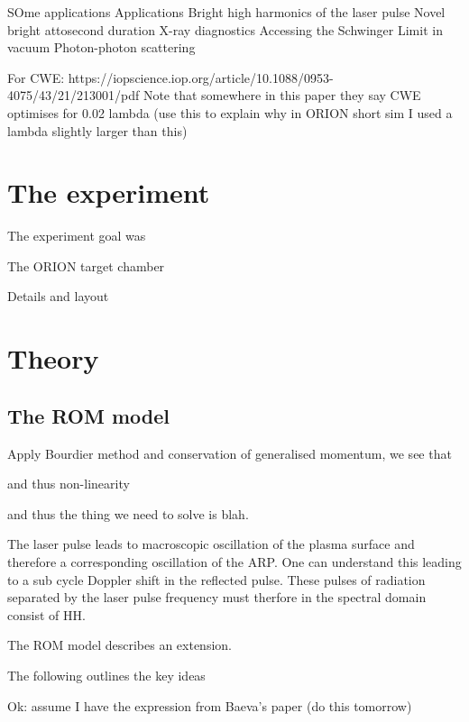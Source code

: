 SOme applications
Applications
Bright high harmonics of the laser pulse
Novel bright attosecond duration X-ray diagnostics
Accessing the Schwinger Limit in vacuum
Photon-photon scattering


For CWE: https://iopscience.iop.org/article/10.1088/0953-4075/43/21/213001/pdf
Note that somewhere in this paper they say CWE optimises for 0.02 lambda (use this to explain why in ORION short sim I used a lambda slightly larger than this)


\section{The experiment}
The experiment goal was

The ORION target chamber

Details and layout


\section{\label{ch:3-sec:theory}Theory}




\subsection{The ROM model}

Apply Bourdier method and conservation of generalised momentum, we see that 

and thus non-linearity

and thus the thing we need to solve is blah.


The laser pulse leads to macroscopic oscillation of the plasma surface and therefore a corresponding oscillation of the ARP. One can understand this leading to a sub cycle Doppler shift in the reflected pulse. These pulses of radiation separated by the laser pulse frequency must therfore in the spectral domain consist of HH.

The \ac{ROM} model describes an extension. 

The following outlines the key ideas 

Ok: assume I have the expression from Baeva's paper (do this tomorrow)


